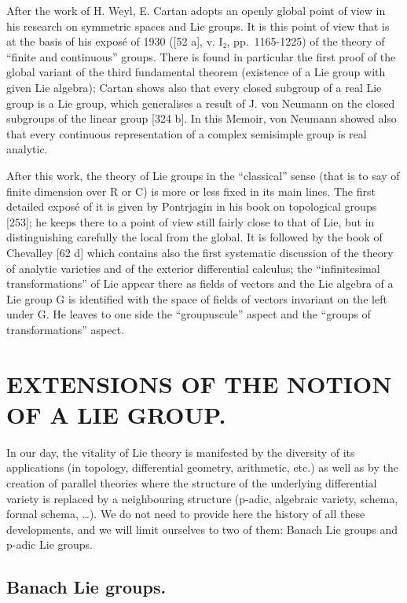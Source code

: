 After the work of H. Weyl, E. Cartan adopts an openly global point of view in his research on symmetric spaces and Lie groups. It is this point of view that is at the basis of his exposé of 1930 ({[}52 a{]}, v. I₂, pp.~1165-1225) of the theory of ``finite and continuous'' groups. There is found in particular the first proof of the global variant of the third fundamental theorem (existence of a Lie group with given Lie algebra); Cartan shows also that every closed subgroup of a real Lie group is a Lie group, which generalises a result of J. von Neumann on the closed subgroups of the linear group {[}324 b{]}. In this Memoir, von Neumann showed also that every continuous representation of a complex semisimple group is real analytic.

After this work, the theory of Lie groups in the ``classical'' sense (that is to say of finite dimension over R or C) is more or less fixed in its main lines. The first detailed exposé of it is given by Pontrjagin in his book on topological groups {[}253{]}; he keeps there to a point of view still fairly close to that of Lie, but in distinguishing carefully the local from the global. It is followed by the book of Chevalley {[}62 d{]} which contains also the first systematic discussion of the theory of analytic varieties and of the exterior differential calculus; the ``infinitesimal transformations'' of Lie appear there as fields of vectors and the Lie algebra of a Lie group G is identified with the space of fields of vectors invariant on the left under G. He leaves to one side the ``groupuscule'' aspect and the ``groups of transformations'' aspect.

\section{EXTENSIONS OF THE NOTION OF A LIE GROUP.}

In our day, the vitality of Lie theory is manifested by the diversity of its applications (in topology, differential geometry, arithmetic, etc.) as well as by the creation of parallel theories where the structure of the underlying differential variety is replaced by a neighbouring structure (p-adic, algebraic variety, schema, formal schema, \ldots). We do not need to provide here the history of all these developments, and we will limit ourselves to two of them: Banach Lie groups and p-adic Lie groups.

\subsection{Banach Lie groups.}

